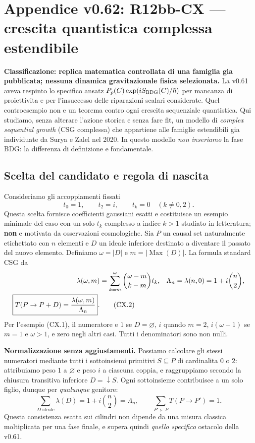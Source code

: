 \documentclass[11pt,a4paper]{article}
\begin{document}
\section*{Appendice v0.62: R12bb-CX --- crescita quantistica complessa estendibile}
\label{sec:r12bbcx}
\textbf{Classificazione: replica matematica controllata di una famiglia gia pubblicata; nessuna dinamica gravitazionale fisica selezionata.}
La v0.61 aveva respinto lo specifico ansatz $P_p(C)\exp(iS_{\rm BDG}(C)/\hbar)$ per mancanza di proiettivita e per l'insuccesso delle riparazioni scalari considerate. Quel controesempio non e un teorema contro ogni crescita sequenziale quantistica. Qui studiamo, senza alterare l'azione storica e senza fare fit, un modello di \emph{complex sequential growth} (CSG complessa) che appartiene alle famiglie estendibili gia individuate da Surya e Zalel nel 2020. In questo modello \emph{non inseriamo} la fase BDG: la differenza di definizione e fondamentale.

\subsection*{Scelta del candidato e regola di nascita}
Consideriamo gli accoppiamenti fissati
\begin{equation}
 t_0=1,\qquad t_2=i,\qquad t_k=0\quad(k\ne0,2). \tag{CX.1}
\end{equation}
Questa scelta fornisce coefficienti gaussiani esatti e costituisce un esempio minimale del caso con un solo $t_k$ complesso a indice $k>1$ studiato in letteratura; \textbf{non} e motivata da osservazioni cosmologiche. Sia $P$ un causal set naturalmente etichettato con $n$ elementi e $D$ un ideale inferiore destinato a diventare il passato del nuovo elemento. Definiamo $\omega=|D|$ e $m=|\operatorname{Max}(D)|$. La formula standard CSG da
\begin{align}
 \lambda(\omega,m)&=\sum_{k=m}^{\omega}\binom{\omega-m}{k-m}t_k,
 &\Lambda_n=\lambda(n,0)=1+i\binom n2,\notag\\
 \boxed{T(P\to P+D)=\frac{\lambda(\omega,m)}{\Lambda_n}}.& \tag{CX.2}
\end{align}
Per l'esempio (CX.1), il numeratore e $1$ se $D=\varnothing$, $i$ quando $m=2$, $i(\omega-1)$ se $m=1$ e $\omega>1$, e zero negli altri casi. Tutti i denominatori sono non nulli.

\textbf{Normalizzazione senza aggiustamenti.} Possiamo calcolare gli stessi numeratori mediante tutti i sottoinsiemi primitivi $S\subseteq P$ di cardinalita $0$ o $2$: attribuiamo peso $1$ a $\varnothing$ e peso $i$ a ciascuna coppia, e raggruppiamo secondo la chiusura transitiva inferiore $D=\downarrow S$. Ogni sottoinsieme contribuisce a un solo figlio, dunque per \emph{qualunque} genitore:
\begin{equation}
 \sum_{D\;\mathrm{ideale}}\lambda(D)=1+i\binom n2=\Lambda_n,
 \qquad\boxed{\sum_{P'\succ P}T(P\to P')=1}.\tag{CX.3}
\end{equation}
Questa consistenza esatta sui cilindri non dipende da una misura classica moltiplicata per una fase finale, e supera quindi \emph{quello specifico} ostacolo della v0.61.
\end{document}
